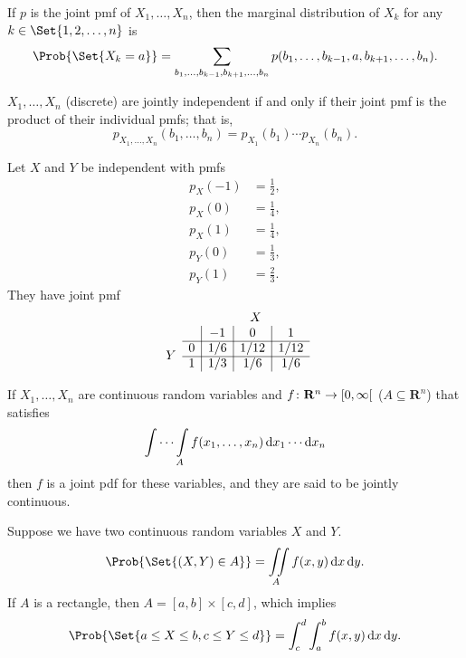 \begin{Definition}{}{}
    If $ p $ is the joint pmf of
    $ X_1,\ldots,X_n $, then the marginal distribution
    of $ X_k $ for any $ k\in\Set{1,2,\ldots,n} $ is
    \[ \Prob{\Set{X_k=a}}=\sum_{b_1,\ldots,b_{k-1},b_{k+1},\ldots,b_n}
        p(b_1,\ldots,b_{k-1},a,b_{k+1},\ldots,b_n). \]
\end{Definition}
\begin{Theorem}{}{}
    $ X_1,\ldots,X_n $ (discrete) are jointly independent
    if and only if their joint pmf is the product of their individual pmfs;
    that is,
    \[ p_{X_1,\ldots,X_n}(b_1,\ldots,b_n)=
        p_{X_1}(b_1)\cdots p_{X_n}(b_n). \]
\end{Theorem}
\begin{Example}{}{}
    Let $ X $ and $ Y $ be independent with pmfs
    \begin{align*}
        p_X(-1) & =\frac{1}{2}, \\
        p_X(0)  & =\frac{1}{4}, \\
        p_X(1)  & =\frac{1}{4}, \\
        p_Y(0)  & =\frac{1}{3}, \\
        p_Y(1)  & =\frac{2}{3}.
    \end{align*}
    They have joint pmf
    \[ \begin{array}{cc|c|c|c}
            \multicolumn{2}{c}{} & \multicolumn{3}{c}{X}                     \\
                                 &                       & -1  & 0    & 1    \\
            \cline{2-5}
            \multirow{2}{*}{$Y$} & 0                     & 1/6 & 1/12 & 1/12 \\
            \cline{2-5}
                                 & 1                     & 1/3 & 1/6  & 1/6
        \end{array} \]
\end{Example}
\begin{Definition}{}{}
    If $ X_1,\ldots,X_n $ are continuous random variables and
    $ f\colon\mathbf{R}^n\to\interval[open right]{0}{\infty} $ ($ A\subseteq\mathbf{R}^n $)
    that satisfies
    \[ \int\cdots\int\limits_{A}f(x_1,\ldots,x_n)\odif{x_1}\cdots\odif{x_n} \]
    then $ f $ is a joint pdf for these variables, and they are said to be
    jointly continuous.
\end{Definition}
\begin{Example}{}{}
    Suppose we have two continuous random variables $ X $ and $ Y $.
    \[ \Prob{\Set{(X,Y)\in A}}=\iint\limits_{A}f(x,y)\odif{x}\odif{y}. \]
    If $ A  $ is a rectangle, then $ A=[a,b]\times[c,d] $,
    which implies
    \[ \Prob{\Set{a\le X\le b, c\le Y\le d}}
        =\int_{c}^{d}\int_{a}^{b}f(x,y)\odif{x}\odif{y}. \]
\end{Example}
